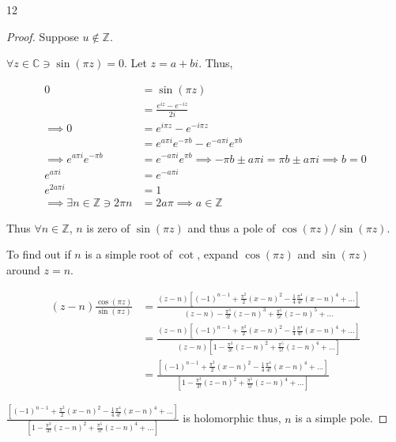 \documentclass{article}
\newcommand{\C}{\mathbb{C}}
\newcommand{\Z}{\mathbb{Z}}
\begin{document}
\bigskip


\begin{PROB}{12}\label{Problem 12.}
\end{PROB}
\begin{proof}
    Suppose $u \not \in \Z$. 
    
    $\forall z \in \C \ni \sin(\pi z) = 0$. Let $z = a + bi$. Thus, 
    
    \begin{align*}
        0 &= \sin(\pi z)\\ &= \frac{e^{iz} - e^{-iz}}{2i} \\
        \implies 0 &= e^{i \pi z} - e^{-i \pi z} \\
        &= e^{a \pi i}e^{-\pi b} - e^{-a \pi i}e^{\pi b} \\
        \implies e^{a \pi i}e^{- \pi b} &= e^{-a \pi i}e^{\pi b} \implies
        -\pi b \pm a \pi i = \pi b \pm a \pi i \implies b = 0 \\
        e^{a \pi i} &= e^{-a \pi i} \\
        e^{2 a \pi i} &= 1 \\
        \implies \exists n \in \Z \ni 2\pi n &= 2a \pi \implies a \in \Z
    \end{align*}

    Thus $\forall n \in \Z$, $n$ is zero of $\sin(\pi z)$ and thus a pole of $\cos( \pi z) / \sin(\pi z).$

    To find out if $n$ is a simple root of $\cot$, expand $\cos(\pi z)$ and $\sin(\pi z)$ around $z = n$.      

    \begin{align*}
        (z - n)\frac{\cos(\pi z)}{\sin(\pi z)} &= \frac{(z - n) \left[(-1)^{n - 1} + \frac{\pi^2}{2}(x - n)^2 - \frac{1}{4} \frac{\pi^4}{4!}(x - n)^4 + ... \right]}{(z - n) - \frac{\pi^3}{3!}(z-n)^3 + \frac{\pi^5}{5!}(z - n)^5 + \dots} \\
        &= \frac{(z - n) \left[(-1)^{n - 1} + \frac{\pi^2}{2}(x - n)^2 - \frac{1}{4} \frac{\pi^4}{4!}(x - n)^4 + ... \right]}{(z-n)[1 - \frac{\pi^3}{3!}(z-n)^2 + \frac{\pi^5}{5!}(z - n)^4 + \dots]} \\
        &= \frac{\left[(-1)^{n - 1} + \frac{\pi^2}{2}(x - n)^2 - \frac{1}{4} \frac{\pi^4}{4!}(x - n)^4 + ... \right]}{[1 - \frac{\pi^3}{3!}(z-n)^2 + \frac{\pi^5}{5!}(z - n)^4 + \dots]}
    \end{align*}


    $\frac{\left[(-1)^{n - 1} + \frac{\pi^2}{2}(x - n)^2 - \frac{1}{4} \frac{\pi^4}{4!}(x - n)^4 + ... \right]}{[1 - \frac{\pi^3}{3!}(z-n)^2 + \frac{\pi^5}{5!}(z - n)^4 + \dots]}$ is holomorphic thus, $n$ is a simple pole. 
    

\end{proof}
\end{document}
